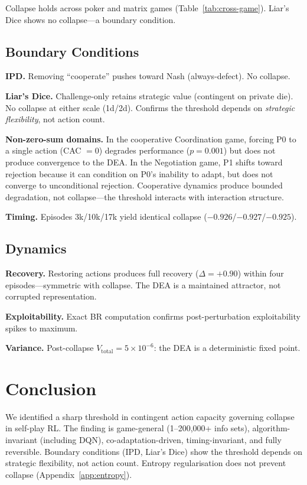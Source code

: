 \documentclass[sigconf,anonymous]{acmart}
\begin{document}
Collapse holds across poker and matrix games (Table~\ref{tab:cross-game}). Liar's Dice shows no collapse---a boundary condition.

\subsection{Boundary Conditions}
\label{sec:boundaries}

\textbf{IPD.} Removing ``cooperate'' pushes toward Nash (always-defect). No collapse.

\textbf{Liar's Dice.} Challenge-only retains strategic value (contingent on private die). No collapse at either scale (1d/2d). Confirms the threshold depends on \emph{strategic flexibility}, not action count.

\textbf{Non-zero-sum domains.} In the cooperative Coordination game, forcing P0 to a single action (CAC $= 0$) degrades performance ($p = 0.001$) but does not produce convergence to the DEA. In the Negotiation game, P1 shifts toward rejection because it can condition on P0's inability to adapt, but does not converge to unconditional rejection. Cooperative dynamics produce bounded degradation, not collapse---the threshold interacts with interaction structure.

\textbf{Timing.} Episodes 3k/10k/17k yield identical collapse ($-0.926$/$-0.927$/$-0.925$).

\subsection{Dynamics}

\textbf{Recovery.} Restoring actions produces full recovery ($\Delta=+0.90$) within four episodes---symmetric with collapse. The DEA is a maintained attractor, not corrupted representation.

\textbf{Exploitability.} Exact BR computation confirms post-perturbation exploitability spikes to maximum.

\textbf{Variance.} Post-collapse $V_{\mathrm{total}}=5{\times}10^{-6}$: the DEA is a deterministic fixed point.

\section{Conclusion}

We identified a sharp threshold in contingent action capacity governing collapse in self-play RL. The finding is game-general (1--200{,}000+ info sets), algorithm-invariant (including DQN), co-adaptation-driven, timing-invariant, and fully reversible. Boundary conditions (IPD, Liar's Dice) show the threshold depends on strategic flexibility, not action count. Entropy regularisation does not prevent collapse (Appendix~\ref{app:entropy}).
\end{document}
